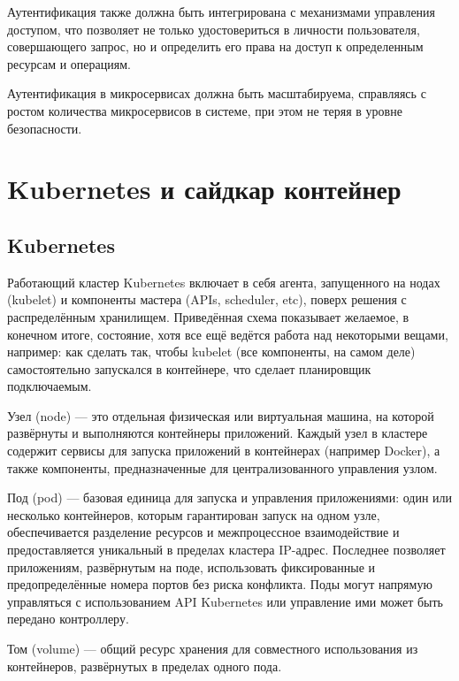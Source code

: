 Аутентификация также должна быть интегрирована с механизмами управления доступом, что позволяет не только удостовериться в личности пользователя, совершающего запрос, но и определить его права на доступ к определенным ресурсам и операциям.

Аутентификация в микросервисах должна быть масштабируема, справляясь с ростом количества микросервисов в системе, при этом не теряя в уровне безопасности.~\cite{m_auth}



\section{Kubernetes и сайдкар контейнер}

\subsection{Kubernetes}
Работающий кластер Kubernetes включает в себя агента, запущенного на нодах (kubelet) и компоненты мастера (APIs, scheduler, etc), поверх решения с распределённым хранилищем. Приведённая схема показывает желаемое, в конечном итоге, состояние, хотя все ещё ведётся работа над некоторыми вещами, например: как сделать так, чтобы kubelet (все компоненты, на самом деле) самостоятельно запускался в контейнере, что сделает планировщик подключаемым.

Узел (node) --- это отдельная физическая или виртуальная машина, на которой развёрнуты и выполняются контейнеры приложений. Каждый узел в кластере содержит сервисы для запуска приложений в контейнерах (например Docker), а также компоненты, предназначенные для централизованного управления узлом.

Под (pod) --- базовая единица для запуска и управления приложениями: один или несколько контейнеров, которым гарантирован запуск на одном узле, обеспечивается разделение ресурсов и межпроцессное взаимодействие и предоставляется уникальный в пределах кластера IP-адрес. Последнее позволяет приложениям, развёрнутым на поде, использовать фиксированные и предопределённые номера портов без риска конфликта. Поды могут напрямую управляться с использованием API Kubernetes или управление ими может быть передано контроллеру.

Том (volume) --- общий ресурс хранения для совместного использования из контейнеров, развёрнутых в пределах одного пода.


